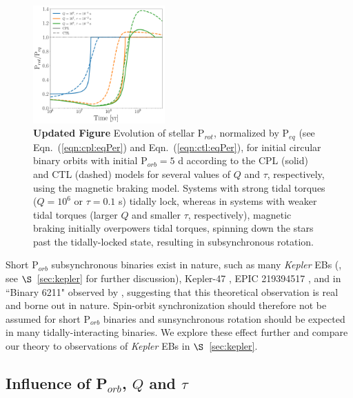 \documentclass[twocolumn]{aastex61}
\newcommand{\xxx}[1]{{\textbf{#1}}}
\newcommand{\kepler}[0]{\textit{Kepler}\xspace}
\begin{document}
\begin{figure}
	\includegraphics[width=0.45\textwidth]{../Plots/eqPerShortPorbMatt.pdf}
   \caption{\xxx{Updated Figure} Evolution of stellar P$_{rot}$, normalized by P$_{eq}$ (see Eqn.~(\ref{eqn:cpl:eqPer}) and Eqn.~(\ref{eqn:ctl:eqPer}), for initial circular binary orbits with initial P$_{orb} = 5$ d according to the CPL (solid) and CTL (dashed) models for several values of $Q$ and $\tau$, respectively, using the \citet{Matt2015} magnetic braking model. Systems with strong tidal torques ($Q = 10^6$ or $\tau = 0.1$ s) tidally lock, whereas in systems with weaker tidal torques (larger $Q$ and smaller $\tau$, respectively), magnetic braking initially overpowers tidal torques, spinning down the stars past the tidally-locked state, resulting in subsynchronous rotation. }%
    \label{fig:eqPerShortPorb}%
\end{figure}


Short P$_{orb}$ subsynchronous binaries exist in nature, such as many \kepler EBs (\citet{Lurie2017}, see $\S$~\ref{sec:kepler} for further discussion), Kepler-47 \citep{Orosz2012}, EPIC 219394517 \citep{Torres2018}, and in ``Binary 6211" observed by \citet{Meibom2006}, suggesting that this theoretical observation is real and borne out in nature. Spin-orbit synchronization should therefore not be assumed for short P$_{orb}$ binaries and sunsynchronous rotation should be expected in many tidally-interacting binaries.  We explore these effect further and compare our theory to observations of \kepler EBs in $\S$~\ref{sec:kepler}.

\subsection{Influence of P$_{orb}$, $Q$ and $\tau$} \label{sec:qTauMaps}
\end{document}
